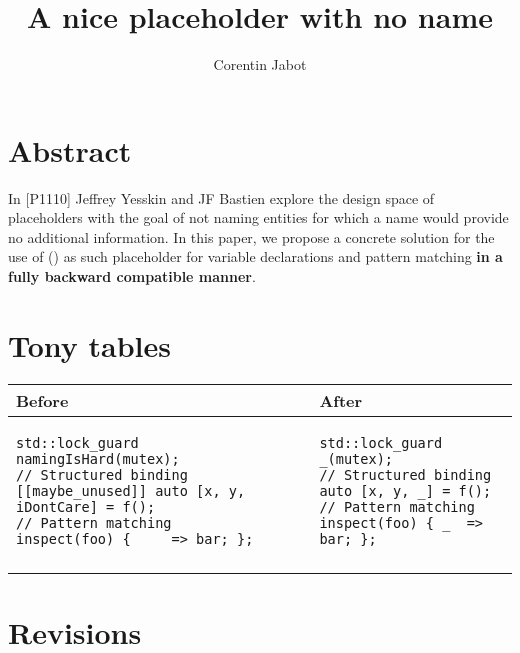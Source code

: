 \documentclass{wg21}
\title{A nice placeholder with no name}
\author{Corentin Jabot}{corentin.jabot@gmail.com}
\begin{document}
\maketitle


\section{Abstract}

In [P1110]\cite{P1110R0} Jeffrey Yesskin and JF Bastien explore the design space of placeholders
with the goal of not naming entities for which a name would provide no additional information.
In this paper, we propose a concrete solution for the use of \tcode{_} () as such placeholder
for variable declarations and pattern matching \textbf{in a fully backward compatible manner}.

\section{Tony tables}
\begin{center}
\begin{tabular}{l|l}
Before & After\\ \hline

\begin{minipage}[t]{0.5\textwidth}
\begin{lstlisting}[style=color]
std::lock_guard namingIsHard(mutex);
// Structured binding
[[maybe_unused]] auto [x, y, iDontCare] = f();
// Pattern matching
inspect(foo) { __  => bar; };

\end{lstlisting}
\end{minipage}
&
\begin{minipage}[t]{0.5\textwidth}
\begin{lstlisting}[style=color]
std::lock_guard _(mutex);
// Structured binding
auto [x, y, _] = f();
// Pattern matching
inspect(foo) { _  => bar; };

\end{lstlisting}
\end{minipage}
\\\\ \hline

\end{tabular}
\end{center}

\section{Revisions}
\end{document}

